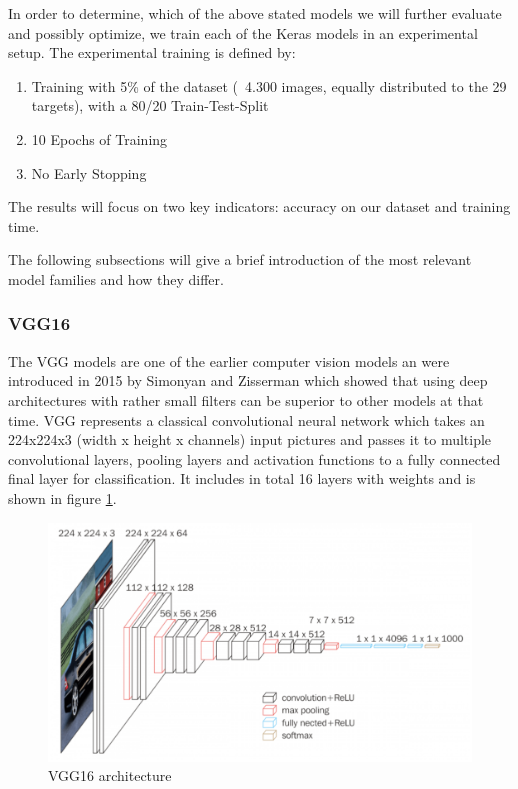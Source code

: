 In order to determine, which of the above stated models we will further evaluate and possibly optimize, we train each of the Keras models in an experimental setup. The experimental training is defined by:
\begin{enumerate}
    \item Training with 5\% of the dataset (~4.300 images, equally distributed to the 29 targets), with a 80/20 Train-Test-Split
    \item 10 Epochs of Training
    \item No Early Stopping
\end{enumerate}

The results will focus on two key indicators: accuracy on our dataset and training time.

The following subsections will give a brief introduction of the most relevant model families and how they differ.

\subsubsection{VGG16}
The VGG models are one of the earlier computer vision models an were introduced in 2015 by Simonyan and Zisserman which showed that using deep architectures with rather small filters can be superior to other models at that time\cite{simonyan2015deep}. VGG represents a classical convolutional neural network which takes an 224x224x3 (width x height x channels) input pictures and passes it to multiple convolutional layers, pooling layers and activation functions to a fully connected final layer for classification. It includes in total 16 layers with weights and is shown in figure \ref{fig:vgg16}.

\begin{figure}
  \centering
  \includegraphics[width=\linewidth]{figures/vgg16.png}
  \caption{VGG16 architecture}
  \label{fig:vgg16}
\end{figure}

